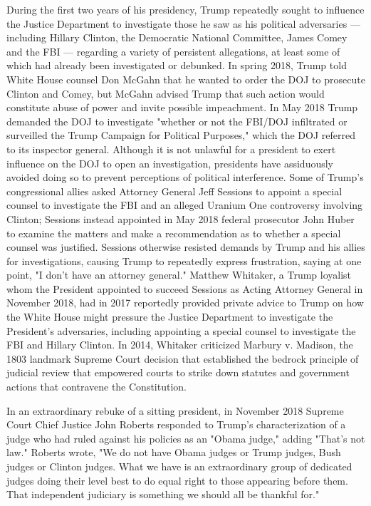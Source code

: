 During the first two years of his presidency, Trump repeatedly sought to
influence the Justice Department to investigate those he saw as his
political adversaries --- including Hillary Clinton, the Democratic
National Committee, James Comey and the FBI --- regarding a variety of
persistent allegations, at least some of which had already been
investigated or debunked. In spring 2018, Trump told White House counsel
Don McGahn that he wanted to order the DOJ to prosecute Clinton and
Comey, but McGahn advised Trump that such action would constitute abuse
of power and invite possible impeachment. In May 2018 Trump demanded the
DOJ to investigate "whether or not the FBI/DOJ infiltrated or surveilled
the Trump Campaign for Political Purposes," which the DOJ referred to
its inspector general. Although it is not unlawful for a president to
exert influence on the DOJ to open an investigation, presidents have
assiduously avoided doing so to prevent perceptions of political
interference. Some of Trump's congressional allies asked Attorney
General Jeff Sessions to appoint a special counsel to investigate the
FBI and an alleged Uranium One controversy involving Clinton; Sessions
instead appointed in May 2018 federal prosecutor John Huber to examine
the matters and make a recommendation as to whether a special counsel
was justified. Sessions otherwise resisted demands by Trump and his
allies for investigations, causing Trump to repeatedly express
frustration, saying at one point, "I don't have an attorney general."
Matthew Whitaker, a Trump loyalist whom the President appointed to
succeed Sessions as Acting Attorney General in November 2018, had in
2017 reportedly provided private advice to Trump on how the White House
might pressure the Justice Department to investigate the President's
adversaries, including appointing a special counsel to investigate the
FBI and Hillary Clinton. In 2014, Whitaker criticized Marbury v.
Madison, the 1803 landmark Supreme Court decision that established the
bedrock principle of judicial review that empowered courts to strike
down statutes and government actions that contravene the Constitution.

In an extraordinary rebuke of a sitting president, in November 2018
Supreme Court Chief Justice John Roberts responded to Trump's
characterization of a judge who had ruled against his policies as an
"Obama judge," adding "That's not law." Roberts wrote, "We do not have
Obama judges or Trump judges, Bush judges or Clinton judges. What we
have is an extraordinary group of dedicated judges doing their level
best to do equal right to those appearing before them. That independent
judiciary is something we should all be thankful for."

